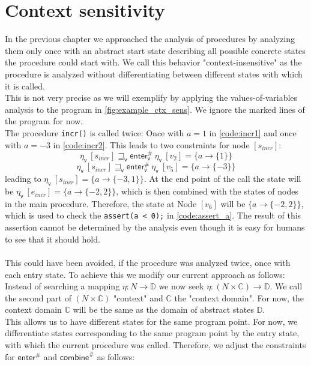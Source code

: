   \section{Context sensitivity}
    In the previous chapter we approached the analysis of procedures by analyzing them only once with an abstract start state describing all possible concrete states the procedure could start with. We call this behavior "context-insensitive" as the procedure is analyzed without differentiating between different states with which it is called.\\
    This is not very precise as we will exemplify by applying the values-of-variables analysis to the program in \autoref{fig:example_ctx_sens}. We ignore the marked lines of the program for now.\\
    The procedure \texttt{incr()} is called twice: Once with $a = 1$ in \autoref{code:incr1} and once with $a = -3$ in \autoref{code:incr2}. This leads to two constraints for node $[s_{incr}]$: 
      \[\eta_\textsf{v}\ [s_{incr}] \sqsupseteq_\textsf{v} \textsf{enter}^{\#}_\textsf{v}\ \eta_\textsf{v}\ [v_2] = \{a \rightarrow \{1\} \} \]
      \[\eta_\textsf{v}\ [s_{incr}] \sqsupseteq_\textsf{v} \textsf{enter}^{\#}_\textsf{v}\ \eta_\textsf{v}\ [v_5] = \{a \rightarrow \{-3\} \} \]
    leading to $\eta_\textsf{v}\ [s_{incr}] = \{a \rightarrow \{-3, 1\}\}$. At the end point of the call the state will be $\eta_\textsf{v}\ [e_{incr}] = \{a \rightarrow \{-2, 2\}\}$, which is then combined with the states of nodes in the main procedure. Therefore, the state at Node $[v_6]$ will be $\{a \rightarrow \{-2, 2\}\}$, which is used to check the \texttt{assert(a < 0);} in \autoref{code:assert_a}. The result of this assertion cannot be determined by the analysis even though it is easy for humans to see that it should hold.\\
    \\
    This could have been avoided, if the procedure was analyzed twice, once with each entry state. To achieve this we modify our current approach as follows: Instead of searching a mapping $\eta: N \rightarrow \mathbb{D}$ we now seek $\eta: (N \times \mathbb{C}) \rightarrow \mathbb{D}$. We call the second part of $(N \times \mathbb{C})$ "context" and $\mathbb{C}$ the "context domain". For now, the context domain $\mathbb{C}$ will be the same as the domain of abstract states $\mathbb{D}$.\\
    This allows us to have different states for the same program point. For now, we differentiate states corresponding to the same program point by the entry state, with which the current procedure was called. Therefore, we adjust the constraints for $\textsf{enter}^{\#}$ and $\textsf{combine}^{\#}$ as follows:
